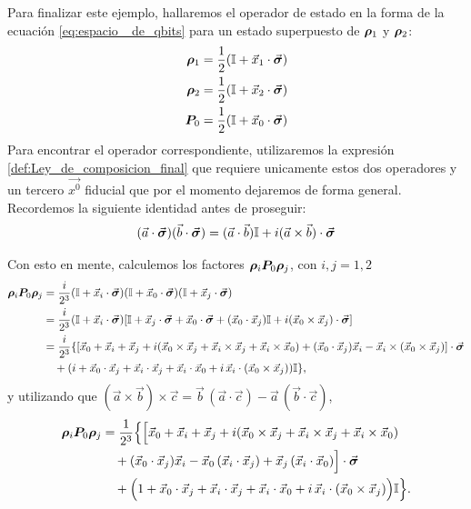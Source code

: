 \documentclass[../Main.tex]{subfiles}
\begin{document}
Para finalizar este ejemplo, hallaremos el operador de estado en la forma de la ecuación \eqref{eq:espacio
_de_qbits} para un estado superpuesto de $\bm{\rho}_1$ y $\bm{\rho}_2$:
\begin{subequations}\label{def:xs_and_its_operadores}
    \begin{align}
        \bm{\rho}_1=\frac{1}{2}\qty(\mathbb{I}+\vec{x}_1\cdot\vec{\bm{\sigma}})\\
        \bm{\rho}_2=\frac{1}{2}\qty(\mathbb{I}+\vec{x}_2\cdot\vec{\bm{\sigma}})\\
        \bm{P}_0=\frac{1}{2}\qty(\mathbb{I}+\vec{x}_0\cdot\vec{\bm{\sigma}})
    \end{align}
\end{subequations}
Para encontrar el operador correspondiente, utilizaremos la expresión
\eqref{def:Ley_de_composicion_final} que requiere unicamente estos dos operadores y un tercero $\vec{x^0}$ fiducial que por el momento dejaremos de forma general. 
Recordemos la siguiente identidad antes de proseguir:
\begin{equation}
    \qty(\vec{a}\cdot\vec{\bm{\sigma}})(\vec{b}\cdot\vec{\bm{\sigma}})=(\vec{a}\cdot\vec{b})\mathbb{I}+i(\vec{a}\times\vec{b})\cdot\vec{\bm{\sigma}}
    \label{eq:identidad_pauli}
\end{equation}

Con esto en mente, calculemos los factores $\bm{\rho}_i \bm{P}_0 \bm{\rho}_j$, con $i,j=1,2$
\begin{align}
\bm{\rho}_i \bm{P}_0 \bm{\rho}_j
&=
\frac{i}{2^3}
\qty(\mathbb{I}+\vec{x}_i\cdot\vec{\bm{\sigma}})
\qty(\mathbb{I}+\vec{x}_0\cdot\vec{\bm{\sigma}})
\qty(\mathbb{I}+\vec{x}_j\cdot\vec{\bm{\sigma}})
\notag\\
&=
\frac{i}{2^3}
(\mathbb{I}+\vec{x}_i\cdot\vec{\bm{\sigma}})
\qty[
\mathbb{I} + \vec{x}_j\cdot\vec{\bm{\sigma}} + \vec{x}_0\cdot\vec{\bm{\sigma}}
+ (\vec{x}_0\cdot \vec{x}_j)\mathbb{I}
+ i(\vec{x}_0\times \vec{x}_j)\cdot\vec{\bm{\sigma}}
]
\notag\\
&=
\frac{i}{2^3}\{
\qty[
\vec{x}_0 + \vec{x}_i + \vec{x}_j
+ i(\vec{x}_0\times \vec{x}_j + \vec{x}_i\times \vec{x}_j + \vec{x}_i\times \vec{x}_0)
+ (\vec{x}_0\cdot \vec{x}_j)\vec{x}_i
- \vec{x}_i\times(\vec{x}_0\times \vec{x}_j)
]\cdot\vec{\bm{\sigma}}
\notag\\
&\quad +
\qty(
i + \vec{x}_0\cdot \vec{x}_j + \vec{x}_i\cdot \vec{x}_j + \vec{x}_i\cdot \vec{x}_0
+ i\, \vec{x}_i\cdot(\vec{x}_0\times \vec{x}_j)
)\mathbb{I}
\},
\label{eq:calc_coefs}
\end{align}
y utilizando que $(\vec{a}\times\vec{b})\times\vec{c}=\vec{b}\,(\vec{a}\cdot\vec{c})-\vec{a}\,(\vec{b}\cdot\vec{c})$,
\begin{align}
\bm{\rho}_i \bm{P}_0 \bm{\rho}_j
&=\frac{1}{2^3}\Big\{
\Big[
\vec{x}_0 + \vec{x}_i + \vec{x}_j
+ i(\vec{x}_0\times \vec{x}_j + \vec{x}_i\times \vec{x}_j + \vec{x}_i\times \vec{x}_0)
\notag\\
&\quad + (\vec{x}_0\cdot \vec{x}_j)\vec{x}_i
- \vec{x}_0\,(\vec{x}_i\cdot \vec{x}_j)
+ \vec{x}_j\,(\vec{x}_i\cdot \vec{x}_0)
\Big]\cdot\vec{\bm{\sigma}}
\notag\\
&\quad +
\Big(
1 + \vec{x}_0\cdot \vec{x}_j + \vec{x}_i\cdot \vec{x}_j + \vec{x}_i\cdot \vec{x}_0
+ i\, \vec{x}_i\cdot(\vec{x}_0\times \vec{x}_j)
\Big)\mathbb{I}
\Big\}.
\label{eq:coef_final_general}
\end{align}
\end{document}
